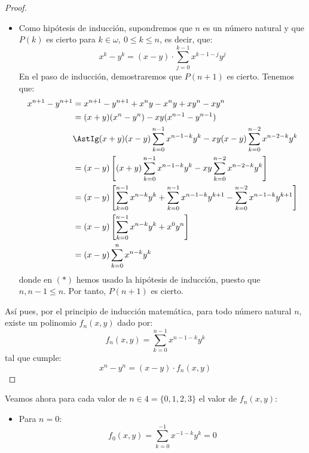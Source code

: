 \documentclass[12pt]{article}
\begin{document}
\begin{ejercicio}[Inducción]
\begin{proof}
\begin{itemize}
                \item Como hipótesis de inducción, supondremos que $n$ es un número natural y que $P(k)$ es cierto para $k\in \omega,~0\leq k\leq n$, es decir, que:
                    \begin{equation*}
                        x^k - y^k = (x-y)\cdot \sum_{j=0}^{k-1}x^{k-1-j}y^j
                    \end{equation*}
                    En el paso de inducción, demostraremos que $P(n+1)$ es cierto. Tenemos que:
                    \begin{align*}
                        x^{n+1} - y^{n+1} &= x^{n+1} - y^{n+1} + x^ny -x^ny +xy^n -xy^n \\
                        &= (x+y)(x^n - y^n) -xy(x^{n-1} - y^{n-1}) \\
                        &\AstIg (x+y)(x-y)\sum_{k=0}^{n-1}x^{n-1-k}y^k -xy(x-y)\sum_{k=0}^{n-2}x^{n-2-k}y^k \\
                        &= (x-y)\left[(x+y)\sum_{k=0}^{n-1}x^{n-1-k}y^k - xy\sum_{k=0}^{n-2}x^{n-2-k}y^k\right] \\
                        &= (x-y)\left[\sum_{k=0}^{n-1}x^{n-k}y^k + \sum_{k=0}^{n-1}x^{n-1-k}y^{k+1} - \sum_{k=0}^{n-2}x^{n-1-k}y^{k+1}\right] \\
                        &= (x-y)\left[\sum_{k=0}^{n-1}x^{n-k}y^k + x^0y^n\right] \\
                        &= (x-y)\sum_{k=0}^{n}x^{n-k}y^k
                    \end{align*}
                    donde en $(\ast)$ hemos usado la hipótesis de inducción, puesto que $n,n-1\leq n$. Por tanto, $P(n+1)$ es cierto.
            \end{itemize}
    
            Así pues, por el principio de inducción matemática, para todo número natural $n$, existe un polinomio $f_n(x, y)$ dado por:
            \begin{equation*}
                f_n(x, y) = \sum_{k=0}^{n-1}x^{n-1-k}y^k
            \end{equation*}
            tal que cumple:
            \begin{equation*}
                x^n - y^n = (x-y)\cdot f_n(x, y)
            \end{equation*}
        \end{proof}

        Veamos ahora para cada valor de $n\in 4= \{0, 1, 2, 3\}$ el valor de $f_n(x, y)$:
            \begin{itemize}
                \item Para $n=0$:
                    \begin{equation*}
                        f_0(x, y) = \sum_{k=0}^{-1}x^{-1-k}y^k = 0
                    \end{equation*}


\end{itemize}
\end{ejercicio}
\end{document}

